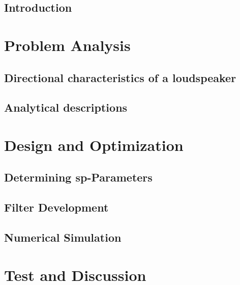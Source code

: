 \glsresetall
 \graphicspath{{figures/analysing/}}
\chapter{Introduction}\label{ch:intro}

\part{Problem Analysis}\label{pt:analysis} \glsresetall
 \graphicspath{{figures/analysing/}}
	\chapter{Directional characteristics of a loudspeaker}\label{ch:directional}
		
		
	\chapter{Analytical descriptions}\label{ch:analytical}
		


	



\part{Design and Optimization}\label{pt:design} 
\graphicspath{{figures/design/}}	
\chapter{Determining \gls{sp}-Parameters}\label{ch:optimization}
	 		
\chapter{Filter Development}
	
\chapter{Numerical Simulation}\label{ch:numerical} 
	  
	 


\part{Test and Discussion}\label{pt:test}
\graphicspath{{figures/tests/}}

